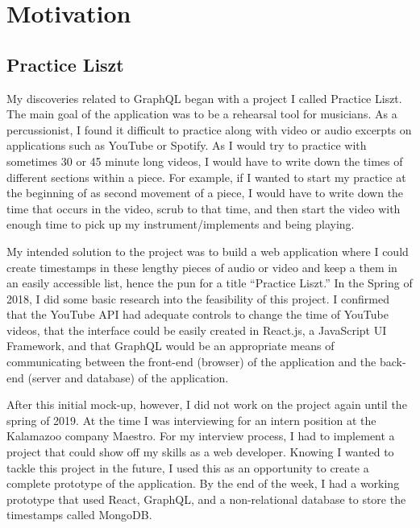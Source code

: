 \section{Motivation}

\subsection{Practice Liszt}
My discoveries related to GraphQL began with a project I called Practice Liszt.  The main goal of the application was to be a rehearsal tool for musicians. As a percussionist, I found it difficult to practice along with video or audio excerpts on applications such as YouTube or Spotify.  As I would try to practice with sometimes 30 or 45 minute long videos, I would have to write down the times of different sections within a piece.  For example, if I wanted to start my practice at the beginning of as second movement of a piece, I would have to write down the time that occurs in the video, scrub to that time, and then start the video with enough time to pick up my instrument/implements and being playing.

My intended solution to the project was to build a web application where I could create timestamps in these lengthy pieces of audio or video and keep a them in an easily accessible list, hence the pun for a title ``Practice Liszt.'' In the Spring of 2018, I did some basic research into the feasibility of this project.  I confirmed that the YouTube API had adequate controls to change the time of YouTube videos, that the interface could be easily created in React.js, a JavaScript UI Framework, and that GraphQL would be an appropriate means of communicating between the front-end (browser) of the application and the back-end (server and database) of the application.

After this initial mock-up, however, I did not work on the project again until the spring of 2019.  At the time I was interviewing for an intern position at the Kalamazoo company Maestro.  For my interview process, I had to implement a project that could show off my skills as a web developer.  Knowing I wanted to tackle this project in the future, I used this as an opportunity to create a complete prototype of the application.  By the end of the week, I had a working prototype that used React, GraphQL, and a non-relational database to store the timestamps called MongoDB.

